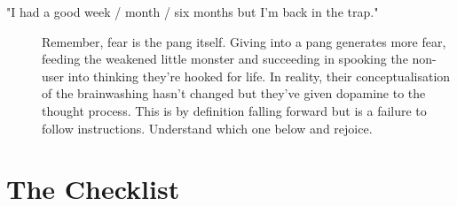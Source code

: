 \documentclass[easypeasy.tex]{subfiles}
\begin{document}
\begin{description}
\begin{description}
     \item ["I had a good week / month / six months but I'm back in the trap."] Remember, fear is the pang itself. Giving into a pang generates more fear, feeding the weakened little monster and succeeding in spooking the non-user into thinking they're hooked for life. In reality, their conceptualisation of the brainwashing hasn't changed but they've given dopamine to the thought process. This is by definition falling forward but is a failure to follow instructions. Understand which one below and rejoice.

\end{description}
\end{description}

\section{The Checklist}
\end{document}
